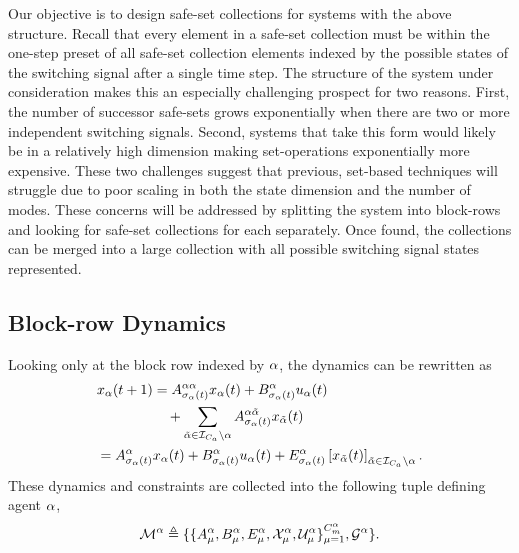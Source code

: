 Our objective is to design safe-set collections for systems with the above structure. Recall that every element in a safe-set collection must be within the one-step preset of all safe-set collection elements indexed by the possible states of the switching signal after a single time step. The structure of the system under consideration makes this an especially challenging prospect for two reasons. First, the number of successor safe-sets grows exponentially when there are two or more independent switching signals. Second, systems that take this form would likely be in a relatively high dimension making set-operations exponentially more expensive. These two challenges suggest that previous, set-based techniques will struggle due to poor scaling in both the state dimension and the number of modes. These concerns will be addressed by splitting the system into block-rows and looking for safe-set collections for each separately. Once found, the collections can be merged into a large collection with all possible switching signal states represented.

\subsection{Block-row Dynamics}
Looking only at the block row indexed by $\alpha$, the dynamics can be rewritten as 
\begin{align}\label{eq:block-row-dyn}
x_\agentidx(t+1)&=A^{\agentidx\agentidx}_{\ss_\agentidx(t)}x_\agentidx(t)+B^\agentidx_{\ss_\agentidx(t)}u_\agentidx(t)\nonumber\\&\quad+\sum_{\tilde\agentidx\in\idxset{\numagents}\setminus \agentidx}A^{\agentidx\tilde\agentidx}_{\ss_\agentidx(t)}x_{\tilde\agentidx}(t)\\
=A^{\agentidx}_{\ss_\agentidx(t)}&x_\agentidx(t)+B^\agentidx_{\ss_\agentidx(t)}u_\agentidx(t)+E^\agentidx_{\ss_\agentidx(t)}\left[x_{\tilde\agentidx}(t)\right]_{\tilde\agentidx\in\idxset{\numagents}\setminus \agentidx}.
\end{align}
These dynamics and constraints are collected into the following tuple defining agent $\alpha$,
$$\agent{\agentidx}\triangleq\{\{A^{\agentidx}_{\modeidx},B^\agentidx_{\modeidx},E^\agentidx_{\modeidx},\xcon[\modeidx]^\agentidx,\ucon[\modeidx]^\agentidx\}_{\modeidx=1}^{\nummodes[\agentidx]},\graph^\agentidx\}.$$

